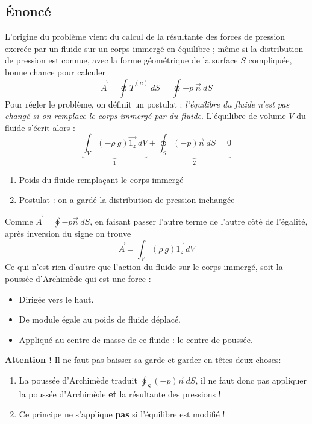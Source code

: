 \subsection{Énoncé}
L'origine du problème vient du calcul de la résultante des forces de pression exercée par
un fluide sur un corps immergé en équilibre ; même si la distribution de pression est 
connue, avec la forme géométrique de la surface $S$ compliquée, bonne chance pour 
calculer 
\begin{equation}
	\vec{A} = \oint \overline{T}^{(n)}\ dS = \oint -p\ \vec{n}\ dS
\end{equation}
Pour régler le problème, on définit un postulat : \textit{l'équilibre du fluide n'est 
pas changé si on remplace le corps immergé par du fluide}. L'équilibre de volume $V$ 
du fluide s'écrit alors :
\begin{equation}
	\underbrace{\int_V (-\rho\ g)\vec{1_z}\ dV}_{1} + \underbrace{\oint_S (-p)\vec{n}\ dS
		=0}_{2}
\end{equation}
\begin{enumerate}
	\item Poids du fluide remplaçant le corps immergé
	\item Postulat : on a gardé la distribution de pression inchangée
\end{enumerate}
Comme $\vec A = \oint - p\vec{n}\ dS$, en faisant passer l'autre terme de l'autre côté
de l'égalité, après inversion du signe on trouve 
\begin{equation}
	\vec{A} = \int_V (\rho\ g)\vec{1_z}\ dV
\end{equation}
Ce qui n'est rien d'autre que l'action du fluide sur le corps immergé, soit la poussée
d'Archimède qui est une force :
\begin{itemize}
	\item Dirigée vers le  haut.
	\item De module égale au poids de fluide déplacé.
	\item Appliqué au centre de masse de ce fluide : le centre de poussée.
\end{itemize}
	
\textbf{Attention !} Il ne faut pas baisser sa garde et garder en têtes deux choses:
\begin{enumerate}
	\item La poussée d'Archimède traduit $\oint_S (-p)\vec{n}\ dS$, il ne faut donc pas 
	      appliquer la poussée d'Archimède \textbf{et} la résultante des pressions !
	\item Ce principe ne s'applique \textbf{pas} si l'équilibre est modifié !
\end{enumerate}    
    
